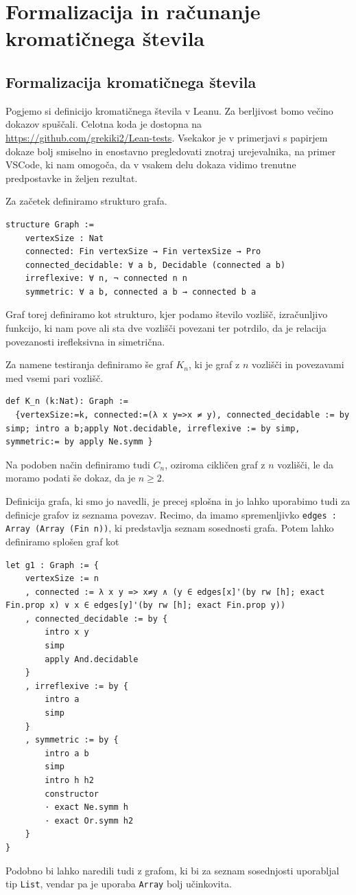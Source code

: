 \documentclass[mat1]{fmfdelo}
\begin{document}
\section{Formalizacija in računanje kromatičnega števila}
\subsection{Formalizacija kromatičnega števila}
Pogjemo si definicijo kromatičnega števila v Leanu.
Za berljivost bomo večino dokazov spuščali.
Celotna koda je dostopna na \url{https://github.com/grekiki2/Lean-tests}.
Vsekakor je v primerjavi s papirjem dokaze bolj smiselno in enostavno pregledovati znotraj urejevalnika, na primer VSCode, ki nam omogoča, da v vsakem delu dokaza vidimo 
trenutne predpostavke in željen rezultat. 

Za začetek definiramo strukturo grafa.
\begin{lstlisting}
structure Graph :=
    vertexSize : Nat
    connected: Fin vertexSize → Fin vertexSize → Pro
    connected_decidable: ∀ a b, Decidable (connected a b)
    irreflexive: ∀ n, ¬ connected n n
    symmetric: ∀ a b, connected a b → connected b a
\end{lstlisting}
Graf torej definiramo kot strukturo, kjer podamo število vozlišč, izračunljivo funkcijo, ki nam pove
ali sta dve vozlišči povezani ter potrdilo, da je relacija povezanosti irefleksivna in simetrična.

Za namene testiranja definiramo še graf $K_n$, ki je graf z $n$ vozlišči in povezavami med vsemi pari vozlišč.
\begin{lstlisting}
def K_n (k:Nat): Graph :=
  {vertexSize:=k, connected:=(λ x y=>x ≠ y), connected_decidable := by simp; intro a b;apply Not.decidable, irreflexive := by simp, symmetric:= by apply Ne.symm }
\end{lstlisting}
Na podoben način definiramo tudi $C_n$, oziroma cikličen graf z $n$ vozlišči, le da moramo podati še dokaz, da je $n\ge2$.

Definicija grafa, ki smo jo navedli, je precej splošna in jo lahko uporabimo tudi za definicje grafov iz seznama povezav.
Recimo, da imamo spremenljivko \lstinline{edges :  Array (Array (Fin n))}, ki predstavlja seznam sosednosti grafa.
Potem lahko definiramo splošen graf kot
\begin{lstlisting}
let g1 : Graph := {
    vertexSize := n
    , connected := λ x y => x≠y ∧ (y ∈ edges[x]'(by rw [h]; exact Fin.prop x) ∨ x ∈ edges[y]'(by rw [h]; exact Fin.prop y))
    , connected_decidable := by {
        intro x y
        simp
        apply And.decidable
    }
    , irreflexive := by {
        intro a
        simp
    }
    , symmetric := by {
        intro a b
        simp
        intro h h2
        constructor
        · exact Ne.symm h
        · exact Or.symm h2
    }
}
\end{lstlisting}
Podobno bi lahko naredili tudi z grafom, ki bi za seznam sosednjosti uporabljal tip \lstinline{List}, vendar pa je uporaba \lstinline{Array} 
bolj učinkovita.
\end{document}
